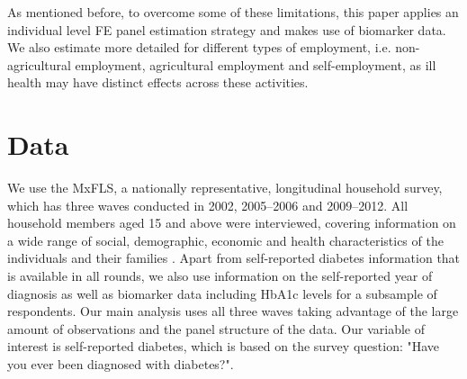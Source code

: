 \documentclass[12pt,english]{article}
\begin{document}
As mentioned before, to overcome some of these limitations, this paper applies an individual level \ac{FE} panel estimation strategy and makes use of biomarker data. We also estimate more detailed for different types of employment, i.e. non-agricultural employment, agricultural employment and self-employment, as ill health may have distinct effects across these activities.
\section{\label{sec:Data}Data}

We use the \acf{MxFLS}, a nationally representative, longitudinal household survey, which has three waves conducted in 2002, 2005--2006 and 2009--2012. All household members aged 15 and above were interviewed, covering information on a wide range of social, demographic, economic and health characteristics of the individuals and their families \parencite{Rubalcava2013}. Apart from self-reported diabetes information that is available in all rounds, we also use information on the self-reported year of diagnosis as well as biomarker data including \ac{HbA1c} levels for a subsample of respondents.  Our main analysis uses all three waves taking advantage of the large amount of observations and the panel structure of the data. Our variable of interest is self-reported diabetes, which is based on the survey question: "Have you ever been diagnosed with diabetes?". 
\end{document}
